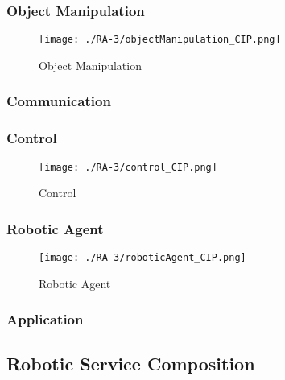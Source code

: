 \subsubsection{Object Manipulation} %
\begin{figure}[ht!]
 \centering
 \texttt{[image: ./RA-3/objectManipulation\_CIP.png]}
 \caption{Object Manipulation}
 \label{fig:objectmanipulation_cip}
\end{figure}

\subsubsection{Communication} %

\subsubsection{Control} %
\begin{figure}[ht!]
 \centering
 \texttt{[image: ./RA-3/control\_CIP.png]}
 \caption{Control}
 \label{fig:control_cip}
\end{figure}

\subsubsection{Robotic Agent} %
\begin{figure}[ht!]
 \centering
 \texttt{[image: ./RA-3/roboticAgent\_CIP.png]}
 \caption{Robotic Agent}
 \label{fig:roboticagent_cip}
\end{figure}

\subsubsection{Application} %

\subsection{Robotic Service Composition}
